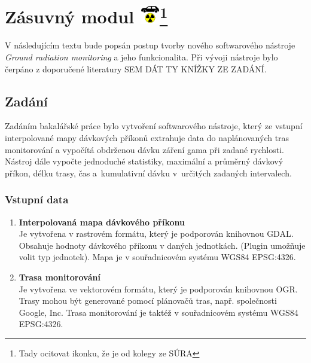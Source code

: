 \chapter[Zásuvný modul]{Zásuvný modul \includegraphics[scale=0.65]{./pictures/ikonka.png}\footnote{Tady ocitovat ikonku, že je od kolegy ze SÚRA}}
\label{4-plugin}

V následujícím textu bude popsán postup tvorby nového softwarového nástroje \textit{Ground radiation monitoring} a jeho funkcionalita. Při vývoji nástroje bylo čerpáno z doporučené literatury SEM DÁT TY KNÍŽKY ZE ZADÁNÍ. 

\section{Zadání}
Zadáním bakalářské práce bylo vytvoření softwarového nástroje, který ze vstupní interpolované mapy dávkových příkonů extrahuje data do naplánovaných tras monitorování a vypočítá obdrženou dávku záření gama při zadané rychlosti. Nástroj dále vypočte jednoduché statistiky, maximální a průměrný dávkový příkon, délku trasy, čas a~kumulativní dávku v~určitých zadaných intervalech.

\subsection{Vstupní data}
\begin{enumerate}
	\item \textbf{Interpolovaná mapa dávkového příkonu} \\
	Je vytvořena v rastrovém formátu, který je podporován knihovnou GDAL. Obsahuje hodnoty dávkového příkonu v daných jednotkách. (Plugin umožňuje volit typ jednotek). Mapa je v souřadnicovém systému WGS84 EPSG:4326.
	\item \textbf{Trasa monitorování} \\
	Je vytvořena ve vektorovém formátu, který je podporován knihovnou OGR. Trasy mohou být generované pomocí plánovačů tras, např. společnosti Google, Inc. Trasa monitorování je taktéž v souřadnicovém systému WGS84 EPSG:4326. 
\end{enumerate}

